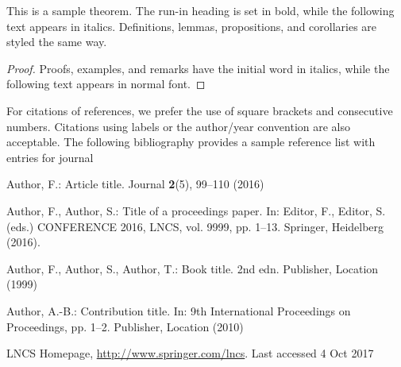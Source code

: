 \documentclass[runningheads]{llncs}
\begin{document}
\begin{theorem}
This is a sample theorem. The run-in heading is set in bold, while
the following text appears in italics. Definitions, lemmas,
propositions, and corollaries are styled the same way.
\end{theorem}
%
%
\begin{proof}
Proofs, examples, and remarks have the initial word in italics,
while the following text appears in normal font.
\end{proof}
For citations of references, we prefer the use of square brackets
and consecutive numbers. Citations using labels or the author/year
convention are also acceptable. The following bibliography provides
a sample reference list with entries for journal
%
%
%
% 
% 
%
\begin{thebibliography}{8}
Author, F.: Article title. Journal \textbf{2}(5), 99--110 (2016)

Author, F., Author, S.: Title of a proceedings paper. In: Editor,
F., Editor, S. (eds.) CONFERENCE 2016, LNCS, vol. 9999, pp. 1--13.
Springer, Heidelberg (2016). 

Author, F., Author, S., Author, T.: Book title. 2nd edn. Publisher,
Location (1999)

Author, A.-B.: Contribution title. In: 9th International Proceedings
on Proceedings, pp. 1--2. Publisher, Location (2010)

LNCS Homepage, \url{http://www.springer.com/lncs}. Last accessed 4
Oct 2017
\end{thebibliography}
\end{document}
